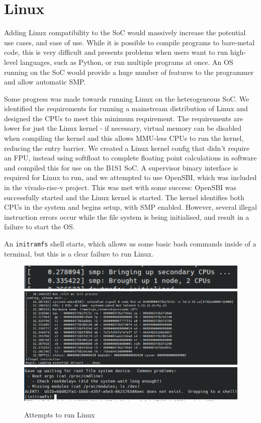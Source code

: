 \section{Linux}
Adding Linux compatibility to the SoC would massively increase the potential use cases, and ease of use. While it is possible to compile programs to bare-metal code, this is very difficult and presents problems when users want to run high-level languages, such as Python, or run multiple programs at once. An OS running on the SoC would provide a huge number of features to the programmer and allow automatic SMP.

Some progress was made towards running Linux on the heterogeneous SoC. We identified the requirements for running a mainstream distribution of Linux and designed the CPUs to meet this minimum requirement. The requirements are lower for just the Linux kernel - if necessary, virtual memory can be disabled when compiling the kernel and this allows MMU-less CPUs to run the kernel, reducing the entry barrier. We created a Linux kernel config that didn't require an FPU, instead using softfloat to complete floating point calculations in software and compiled this for use on the B1S1 SoC. A supervisor binary interface is required for Linux to run, and we attempted to use OpenSBI, which was included in the vivado-risc-v\cite{vivado-risc-v} project. This was met with some success: OpenSBI was successfully started and the Linux kernel is started. The kernel identifies both CPUs in the system and begins setup, with SMP enabled. However, several illegal instruction errors occur while the file system is being initialised, and result in a failure to start the OS. 

An \texttt{initramfs} shell starts, which allows us some basic bash commands inside of a terminal, but this is a clear failure to run Linux.

\begin{figure}
    \centering
    \includegraphics[width=\textwidth]{img/linux_smp.png}
    \includegraphics[width=\textwidth]{img/illegal_inst.png}
    \includegraphics[width=\textwidth]{img/initramfs_shell.png}
    \caption{Attempts to run Linux}
    \label{fig:linux_attempt}
\end{figure}